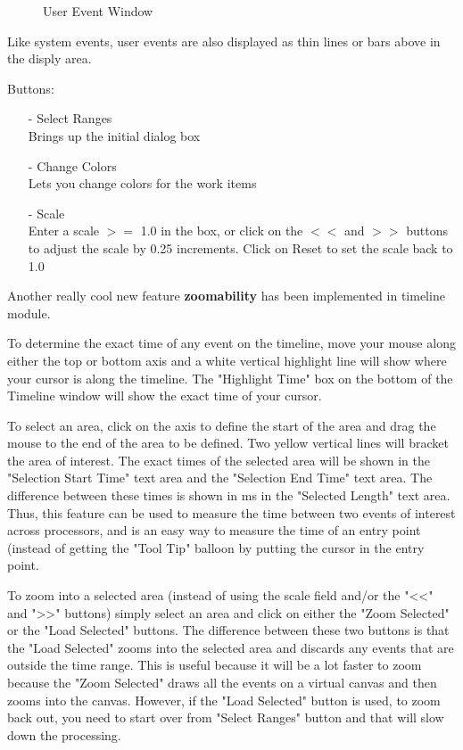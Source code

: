 \documentclass[10pt,dvips]{article}
\begin{document}
\begin{enumerate}
\begin{itemize}
      \begin{figure}[htb]
      \center
      \caption{User Event Window}
      \label{userevent}
      \end{figure}

        Like system events, user events are also displayed as thin lines or bars
	above in the disply area.
      \end{itemize}
      Buttons:
      \begin{itemize}
      \item[-]
        Select Ranges\\
        Brings up the initial dialog box
      \item[-]
        Change Colors\\
        Lets you change colors for the work items
      \item[-]
        Scale\\
        Enter a scale $>=$ 1.0 in the box, or click on the $<<$ and $>>$ buttons to
        adjust the scale by 0.25 increments.  Click on Reset to set the scale
        back to 1.0
      \end{itemize}

      Another really cool new feature {\bf zoomability} has been implemented in
      timeline module.

      To determine the exact time of any event on the timeline, move your mouse
      along either the top or bottom axis and a white vertical highlight line
      will show where your cursor is along the timeline.  The "Highlight Time"
      box on the bottom of the Timeline window will show the exact time of your
      cursor.

      To select an area, click on the axis to define the start of the area and
      drag the mouse to the end of the area to be defined.  Two yellow vertical
      lines will bracket the area of interest.  The exact times of the selected
      area will be shown in the "Selection Start Time" text area and the
      "Selection End Time" text area.  The difference between these times is
      shown in ms in the "Selected Length" text area.  Thus, this feature can be
      used to measure the time between two events of interest across processors,
      and is an easy way to measure the time of an entry point (instead of
      getting the "Tool Tip" balloon by putting the cursor in the entry point.

      To zoom into a selected area (instead of using the scale field and/or the
      "<<" and ">>" buttons) simply select an area and click on either the "Zoom
      Selected" or the "Load Selected" buttons.  The difference between these
      two buttons is that the "Load Selected" zooms into the selected area and
      discards any events that are outside the time range.  This is useful
      because it will be a lot faster to zoom because the "Zoom Selected" draws
      all the events on a virtual canvas and then zooms into the canvas.
      However, if the "Load Selected" button is used, to zoom back out, you need
      to start over from "Select Ranges" button and that will slow down the processing.


\end{enumerate}
\end{document}
